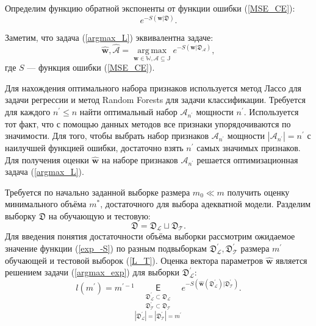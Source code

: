 \documentclass[12pt, a4paper]{scrartcl}
\DeclareMathOperator*{\argmax}{arg\,max}
\theoremstyle{plain}
\theoremstyle{definition}
\begin{document}
Определим функцию обратной экспоненты от функции ошибки (\ref{MSE_CE}):
\begin{equation}\label{exp_-S}
e^{-S(\mathbf{w} | \mathfrak{D})}.
\end{equation}

Заметим, что задача (\ref{argmax_L}) эквивалентна задаче:
\begin{equation}\label{argmax_exp}
\hat{\textbf{w}}, \hat{\mathcal{A}} = \argmax\limits_{\mathbf{w} \in \mathbb{W}, \mathcal{A} \subseteq \mathbb{J}} e^{-S(\mathbf{w} | \mathfrak{D}_{\mathcal{A}})},
\end{equation}
где $S$ --- функция ошибки (\ref{MSE_CE}).

Для нахождения оптимального набора признаков используется метод Лассо для задачи регрессии и метод Random Forests для задачи классификации. Требуется для каждого $n^{\prime} \leq n$ найти оптимальный набор $\mathcal{A}_{n^{\prime}}$ мощности $n^{\prime}$. Используется тот факт, что с помощью данных методов все признаки упорядочиваются по значимости. Для того, чтобы выбрать набор признаков $\mathcal{A}_{n^{\prime}}$ мощности $|\mathcal{A}_{n^{\prime}}| = n^{\prime}$ с наилучшей функцией ошибки, достаточно взять $n^{\prime}$ самых значимых признаков.  Для получения оценки $\hat{\mathbf{w}}$ на наборе признаков $\mathcal{A}_{n^{\prime}}$ решается оптимизационная задача (\ref{argmax_L}).

Требуется по начально заданной выборке размера $m_0 \ll m$ получить оценку минимального объёма $m^{*}$, достаточного для выбора адекватной модели. Разделим выборку $\mathfrak{D}$ на обучающую и тестовую:
\begin{equation}\label{L_T}
\mathfrak{D} = \mathfrak{D}_{\mathcal{L}} \sqcup \mathfrak{D}_{\mathcal{T}}.
\end{equation}
Для введения понятия достаточности объёма  выборки рассмотрим ожидаемое значение функции (\ref{exp_-S}) по разным подвыборкам $\mathfrak D^{\prime}_{\mathcal{L}}, \mathfrak D^{\prime}_{\mathcal{T}}$ размера $m^{\prime}$ обучающей и тестовой выборок (\ref{L_T}). Оценка вектора параметров $\hat{\mathbf{w}}$ является решением задачи (\ref{argmax_exp}) для выборки $\mathfrak D^{\prime}_{\mathcal{L}}$:
\begin{equation}\label{l}
l(m^{\prime}) = m^{\prime-1}\underset{|\mathfrak D^{\prime}_{\mathcal{L}}| = |\mathfrak D^{\prime}_{\mathcal{T}}| = m^{\prime}}{\underset{\mathfrak D^{\prime}_{\mathcal{T}} \subset \mathfrak D_{\mathcal{T}}}{\underset{\mathfrak D^{\prime}_{\mathcal{L}} \subset \mathfrak D_{\mathcal{L}}}{\mathsf E}}} e^{-S(\hat{\mathbf{w}}(\mathfrak{D}^{\prime}_{\mathcal{L}}) | \mathfrak{D}^{\prime}_{\mathcal{T}})}.
\end{equation}
\end{document}

